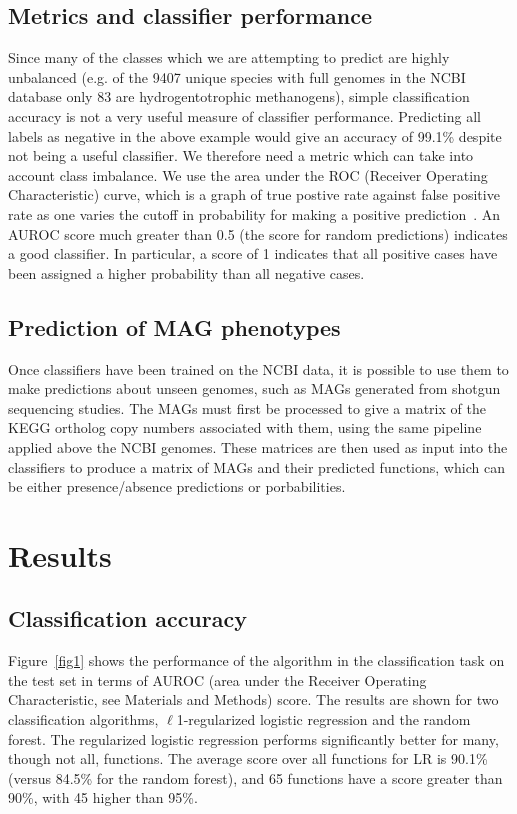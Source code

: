 \documentclass[10pt,letterpaper]{article}
\begin{document}
\subsection*{Metrics and classifier performance}
Since many of the classes which we are attempting to predict are highly unbalanced (e.g. of the 9407 unique species with full genomes in the NCBI database only 83 are hydrogentotrophic methanogens), simple classification accuracy is not a very useful measure of classifier performance. Predicting all labels as negative in the above example would give an accuracy of 99.1\% despite not being a useful classifier. We therefore need a metric which can take into account class imbalance. We use the area under the ROC (Receiver Operating Characteristic) curve, which is a graph of true postive rate against false positive rate as one varies the cutoff in probability for making a positive prediction~\cite{Fawcett2006,Flach2011}. An AUROC score much greater than 0.5 (the score for random predictions) indicates a good classifier. In particular, a score of 1 indicates that all positive cases have been assigned a higher probability than all negative cases.

\subsection*{Prediction of MAG phenotypes}
Once classifiers have been trained on the NCBI data, it is possible to use them to make predictions about unseen genomes, such as MAGs generated from shotgun sequencing studies. The MAGs must first be processed to give a matrix of the KEGG ortholog copy numbers associated with them, using the same pipeline applied above the NCBI genomes. These matrices are then used as input into the classifiers to produce a matrix of MAGs and their predicted functions, which can be either presence/absence predictions or porbabilities. 





\section*{Results}
\subsection*{Classification accuracy}
Figure~\ref{fig1} shows the performance of the algorithm in the classification task on the test set in terms of AUROC (area under the Receiver Operating Characteristic, see Materials and Methods) score. The results are shown for two classification algorithms, $\ell$1-regularized logistic regression and the random forest. The regularized logistic regression performs significantly better for many, though not all, functions. The average score over all functions for LR is 90.1\% (versus 84.5\% for the random forest), and 65 functions have a score greater than 90\%, with 45 higher than 95\%.
\end{document}
